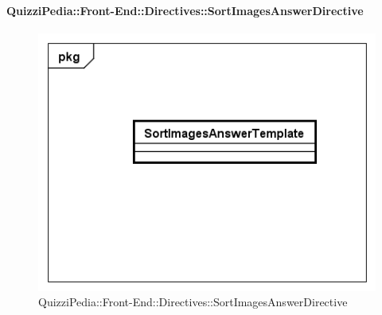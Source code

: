		\paragraph{QuizziPedia::Front-End::Directives::SortImagesAnswerDirective}
		
		\label{QuizziPedia::Front-End::Directives::SortImagesAnswerDirective}
		
		\begin{figure}[ht]
			\centering
			\includegraphics[scale=0.5,keepaspectratio]{UML/Classi/Front-End/QuizziPedia_Front-end_Templates_SortImagesAnswerTemplate.png}
			\caption{QuizziPedia::Front-End::Directives::SortImagesAnswerDirective}
		\end{figure} \FloatBarrier
		
